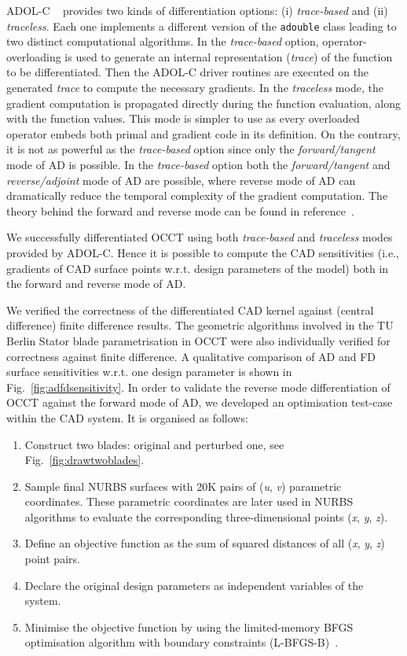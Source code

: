 \documentclass[9pt,academicons]{article}
\begin{document}
ADOL-C ~\cite{walther_griewank_adolc} provides two kinds of differentiation options: (i) \textit{trace-based} and (ii) \textit{traceless}. Each one implements a different version of the \texttt{adouble} class leading to two distinct computational algorithms. In the \textit{trace-based} option, operator-overloading is used to generate an internal representation (\textit{trace}) of the function to be differentiated. Then the ADOL-C driver routines are executed on the generated \textit{trace} to compute the necessary gradients.
In the \textit{traceless} mode, the gradient computation is propagated directly during the function evaluation, along with the function values. This mode is simpler to use as every overloaded operator embeds both primal and gradient code in its definition. On the contrary, it is not as powerful as the \textit{trace-based} option since only the \textit{forward/tangent} mode of AD is possible. In the \textit{trace-based} option both the \textit{forward/tangent} and \textit{reverse/adjoint} mode of AD are possible, where reverse mode of AD can dramatically reduce the temporal complexity of the gradient computation. The theory behind the forward and reverse mode can be found in reference~\cite{griewank_evaluating_2008}.

We successfully differentiated OCCT using both \textit{trace-based} and \textit{traceless} modes provided by ADOL-C. Hence it is possible to compute the CAD sensitivities (i.e., gradients of CAD surface points w.r.t. design parameters of the model) both in the forward and reverse mode of AD.

We verified the correctness of the differentiated CAD kernel against (central difference) finite difference results. The geometric algorithms involved in the TU Berlin Stator blade parametrisation in OCCT were also individually verified for correctness against finite difference. A qualitative comparison of AD and FD surface sensitivities w.r.t. one design parameter is shown in Fig.~\ref{fig:adfdsensitivity}.
In order to validate the reverse mode differentiation of OCCT against the forward mode of AD, we developed an optimisation test-case within the CAD system. It is organised as follows:

\begin{enumerate}[itemsep=0em]
 \item Construct two blades: original and perturbed one, see Fig.~\ref{fig:drawtwoblades}.
 \item Sample final NURBS surfaces with 20K pairs of (\textit{u}, \textit{v}) parametric coordinates. These parametric coordinates are later used in NURBS algorithms to evaluate the corresponding three-dimensional points (\textit{x}, \textit{y}, \textit{z}).
 \item Define an objective function as the sum of squared distances of all (\textit{x}, \textit{y}, \textit{z}) point pairs.
 \item Declare the original design parameters as independent variables of the system.
 \item Minimise the objective function by using the limited-memory BFGS optimisation algorithm with boundary constraints (L-BFGS-B)~\cite{zhu1997algorithm}.
\end{enumerate}
\end{document}
